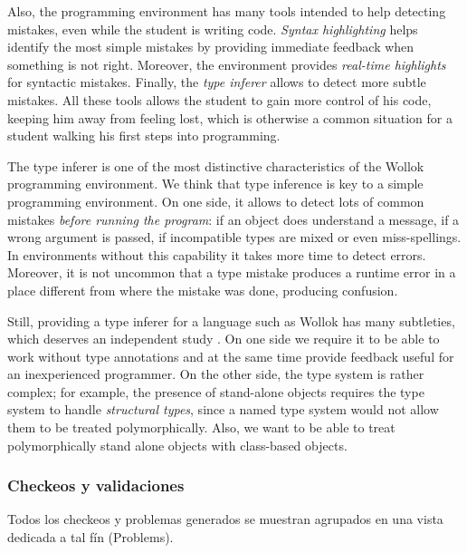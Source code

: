 Also, the programming environment has many tools intended to help detecting mistakes, even while the student is writing code.
\emph{Syntax highlighting} helps identify the most simple mistakes by providing immediate feedback when something is not right. 
Moreover, the environment provides \emph{real-time highlights} for syntactic mistakes.
Finally, the \emph{type inferer} allows to detect more subtle mistakes.
All these tools allows the student to gain more control of his code, keeping him away from feeling lost, 
which is otherwise a common situation for a student walking his first steps into programming.


\medskip
The type inferer is one of the most distinctive characteristics of the Wollok programming environment.
We think that type inference is key to a simple programming environment.
On one side, it allows to detect lots of common mistakes \emph{before running the program}:
if an object does understand a message, if a wrong argument is passed, if incompatible types are mixed or even miss-spellings.
In environments without this capability it takes more time to detect errors.
Moreover, it is not uncommon that a type mistake produces a runtime error in a place different from where the mistake was done, producing confusion.

Still, providing a type inferer for a language such as Wollok has many subtleties, which deserves an independent study \cite{type inferer}.
On one side we require it to be able to work without type annotations and at the same time provide feedback useful for an inexperienced programmer.
On the other side, the type system is rather complex;
for example, the presence of stand-alone objects requires the type system to handle \emph{structural types}, since a named type system would not allow them to be treated polymorphically.
Also, we want to be able to treat polymorphically stand alone objects with class-based objects.

\subsubsection{Checkeos y validaciones}
 
Todos los checkeos y problemas
generados se muestran agrupados en una vista dedicada a tal fín (Problems).

